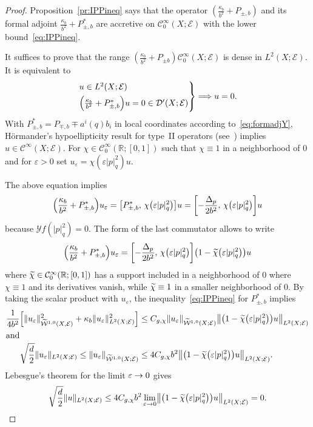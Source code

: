 \documentclass[AHL,Unicode,longabstracts]{cedram}
\newcommand{\R}{\mathbb{R}}
\newcommand{\clW}{\mathcal{W}}
\newcommand{\clC}{\mathcal{C}}
\newcommand{\clY}{\mathcal{Y}}
\newcommand{\clE}{\mathcal{E}}
\newcommand{\clD}{\mathcal{D}}
\let\oldtilde\tilde
\renewcommand*{\tilde}[1]{\mathchoice{\widetilde{#1}}{\widetilde{#1}}{\oldtilde{#1}}{\oldtilde{#1}}}
\let\originalleft\left
\let\originalright\right
\renewcommand{\left}{\mathopen{}\mathclose\bgroup\originalleft}
\renewcommand{\right}{\aftergroup\egroup\originalright}
\renewcommand*{\to}{\mathchoice{\longrightarrow}{\rightarrow}{\rightarrow}{\rightarrow}}
\renewcommand*{\implies}{\mathchoice{\Longrightarrow}{\Rightarrow}{\Rightarrow}{\Rightarrow}}
\begin{document}
\begin{proof}
Proposition~\ref{pr:IPPineq} says that the operator $(\frac{\kappa_{b}}{b^{2}}+P_{\pm, b})$ and its formal adjoint $\frac{\kappa_{b}}{b^{2}}+P_{\pm,b}^{*}$ are accretive on $\clC^{\infty}_{0}(X;\clE)$ with the lower bound~\eqref{eq:IPPineq}.

It suffices to prove that the range $(\frac{\kappa_{b}}{b^{2}}+P_{\pm b})\clC^{\infty}_{0}(X;\clE)$ is dense in $L^{2}(X;\clE)$. It is equivalent to
\[
\begin{rcases}
u\in L^{2}(X;\clE)\\
\left(\frac{\kappa_{b}}{b^{2}}+P_{\pm, b}^{*}\right)u=0\in \clD'(X;\clE)
\end{rcases}
\implies u=0.
\]
With $P_{\pm,b}^{*}=P_{\mp,b}\mp a^{i}(q)b_{i}$ in local coordinates according to~\eqref{eq:formadjY}, H\"ormander's hypoellipticity result for type~II operators (see~\cite{Hor67}) implies $u\in \clC^{\infty}(X;\clE)$. For $\chi\in \clC^{\infty}_{0}(\R;[0,1])$ such that $\chi\equiv 1$ in a neighborhood of $0$ and for $\varepsilon>0$ set $u_{\varepsilon}=\chi(\varepsilon|p|_{q}^{2})u$.

The above equation implies
\[
\left(\frac{\kappa_{b}}{b^{2}}+P_{\pm,b}^{*}\right)u_{\varepsilon}=\left[P_{\pm, b}^{*},\,\chi\left(\varepsilon |p|_{q}^{2}\right)\right]u = \left[-\frac{\Delta_{p}}{2b^{2}},\,\chi\left(\varepsilon|p|_{q}^{2}\right)\right]u
\]
because $\clY f(|p|_{q}^{2})=0$. The form of the last commutator allows to write
\[
\left(\frac{\kappa_{b}}{b^{2}}+P_{\pm,b}^{*}\right)u_{\varepsilon}= \left[-\frac{\Delta_{p}}{2b^{2}},\,\chi\left(\varepsilon|p|_{q}^{2}\right)\right]\left(1-\tilde{\chi}\left(\varepsilon |p|_{q}^{2}\right)\right)u
\]
where $\tilde{\chi}\in \clC^{\infty}_{0}(\R;[0,1])$ has a support included in a neighborhood of $0$ where $\chi\equiv 1$ and its derivatives vanish, while $\tilde{\chi}\equiv 1$ in a smaller neighborhood of $0$. By taking the scalar product with $u_{\varepsilon}$, the inequality~\eqref{eq:IPPineq} for $P_{\pm,b}^{*}$ implies
\begin{align*}
\frac{1}{4b^{2}}\left[\|u_{\varepsilon}\|_{\widetilde{\clW}^{1,0}(X,\clE)}^{2}+\kappa_{b}\|u_{\varepsilon}\|^{2}_{L^{2}(X;\clE)}\right] &\leq C_{g,\chi}\|u_{\varepsilon}\|_{\widetilde{\clW}^{1,0}(X;\clE)}\left\|\left(1-\tilde{\chi}\left(\varepsilon|p|_{q}^{2}\right)\right)u\right\|_{L^{2}(X;\clE)}
\\
\intertext{and}
\sqrt{\frac{d}{2}}\|u_{\varepsilon}\|_{L^{2}(X;\clE)}\leq \|u_{\varepsilon}\|_{\widetilde{\clW}^{1,0}(X;\clE)} &\leq 4C_{g,\chi}b^{2}\left\|\left(1-\tilde{\chi}\left(\varepsilon|p|_{q}^{2}\right)\right)u\right\|_{L^{2}(X;\clE)}.
\end{align*}
Lebesgue's theorem for the limit $\varepsilon\to 0$ gives
\[
\sqrt{\frac{d}{2}}\|u\|_{L^{2}(X;\clE)}\leq 4C_{g,\chi}b^{2}\lim_{\varepsilon\to 0}
\left\|\left(1-\tilde{\chi}\left(\varepsilon|p|_{q}^{2}\right)\right)u\right\|_{L^{2}(X;\clE)}=0.\qedhere
\]
\end{proof}
\end{document}

